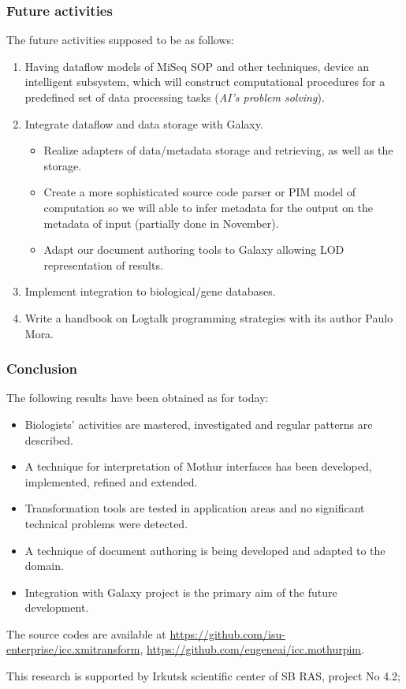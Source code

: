 \documentclass[10pt]{beamer}
\begin{document}
\begin{frame}
  \frametitle{Future activities}
  The future activities supposed to be as follows:
  \begin{enumerate}
  \item Having dataflow models of MiSeq SOP and other techniques, device an intelligent subsystem, which will construct computational procedures for a predefined set of data processing tasks (\emph{AI's problem solving}).
  \item Integrate dataflow and data storage with Galaxy.
    \begin{itemize}
       \item Realize adapters of data/metadata storage and retrieving, as well as the storage.
       \item Create a more sophisticated source code parser or PIM model of computation so we will able to infer metadata for the output on the metadata of input (partially done in November).
       \item Adapt our document authoring tools to Galaxy allowing LOD representation of results.
  \end{itemize}
  \item Implement integration to biological/gene databases.
  \item Write a handbook on Logtalk programming strategies with its author Paulo Mora.
  \end{enumerate}
\end{frame}

\begin{frame}
  \frametitle{Conclusion}
  The following results have been obtained as for today:
  \begin{itemize}
  \item Biologists' activities are mastered, investigated and regular patterns are described.
  \item A technique for interpretation of Mothur interfaces has been developed, implemented, refined and extended.
  \item Transformation tools are tested in application areas and no significant technical problems were detected.
  \item A technique of document authoring is being developed and adapted to the domain.
  \item Integration with Galaxy project is the primary aim of the future development.
  \end{itemize}
  The source codes are available at \url{https://github.com/isu-enterprise/icc.xmitransform}, \url{https://github.com/eugeneai/icc.mothurpim}.

  This research is supported by Irkutsk scientific center of SB RAS, project No 4.2;
\end{frame}
\end{document}
